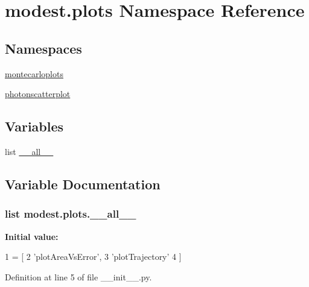 \hypertarget{namespacemodest_1_1plots}{}\section{modest.\+plots Namespace Reference}
\label{namespacemodest_1_1plots}
\subsection*{Namespaces}
\begin{DoxyCompactItemize}
\item 
 \hyperlink{namespacemodest_1_1plots_1_1montecarloplots}{montecarloplots}
\item 
 \hyperlink{namespacemodest_1_1plots_1_1photonscatterplot}{photonscatterplot}
\end{DoxyCompactItemize}
\subsection*{Variables}
\begin{DoxyCompactItemize}
\item 
list \hyperlink{namespacemodest_1_1plots_aedbfdd69674be9bdda4c778bffbbeae2}{\+\_\+\+\_\+all\+\_\+\+\_\+}
\end{DoxyCompactItemize}


\subsection{Variable Documentation}
\subsubsection[{\texorpdfstring{\+\_\+\+\_\+all\+\_\+\+\_\+}{__all__}}]{\setlength{\rightskip}{0pt plus 5cm}list modest.\+plots.\+\_\+\+\_\+all\+\_\+\+\_\+\hspace{0.3cm}{\ttfamily [private]}}\hypertarget{namespacemodest_1_1plots_aedbfdd69674be9bdda4c778bffbbeae2}{}\label{namespacemodest_1_1plots_aedbfdd69674be9bdda4c778bffbbeae2}
{\bfseries Initial value\+:}
\begin{DoxyCode}
1 = [
2 \textcolor{stringliteral}{'plotAreaVsError'},
3 \textcolor{stringliteral}{'plotTrajectory'}
4 ]
\end{DoxyCode}


Definition at line 5 of file \+\_\+\+\_\+init\+\_\+\+\_\+.\+py.

